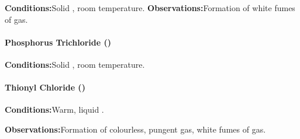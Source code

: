 				\vspace{1.5em}
				\vbox{\textbf{Conditions:}\tabto{35mm}Solid , room temperature.}
				\vbox{\textbf{Observations:}\tabto{35mm}Formation of white fumes of  gas.}





				\paragraph{Phosphorus Trichloride ()}

				\vspace{1.5em}
				\vbox{\textbf{Conditions:}\tabto{35mm}Solid , room temperature.}





				\paragraph{Thionyl Chloride ()}

				\vspace{1.5em}
				\vbox{\textbf{Conditions:}\tabto{35mm}Warm, liquid .}

				\vspace{0.75em}
				\vbox{\textbf{Observations:}\tabto{35mm}Formation of colourless, pungent  gas,
											\tabto{35mm}white fumes of  gas.}





